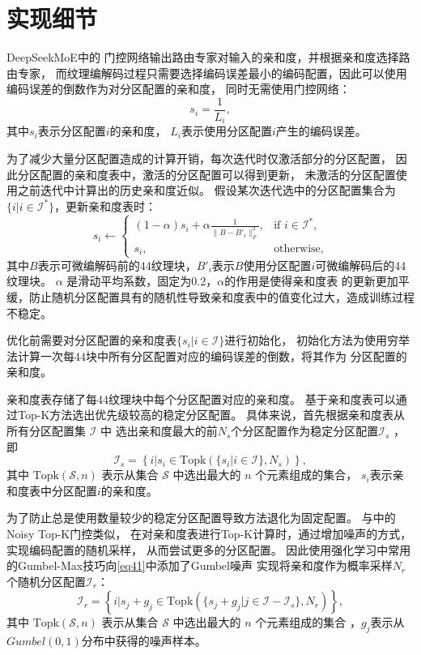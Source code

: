 \section{实现细节}

DeepSeekMoE\cite{dai2024deepseekmoe}中的
门控网络输出路由专家对输入的亲和度，并根据亲和度选择路由专家，
而纹理编解码过程只需要选择编码误差最小的编码配置，因此可以使用编码误差的倒数作为对分区配置的亲和度，
同时无需使用门控网络：
\begin{equation}
s_i=\frac{1}{L_i},
\end{equation}
其中$s_i$表示分区配置$i$的亲和度，
$L_i$表示使用分区配置$i$产生的编码误差。

为了减少大量分区配置造成的计算开销，每次迭代时仅激活部分的分区配置，
因此分区配置的亲和度表中，激活的分区配置可以得到更新，
未激活的分区配置使用之前迭代中计算出的历史亲和度近似。
假设某次迭代选中的分区配置集合为$\{i|i\in\mathcal{I}^*\}$，更新亲和度表时：
\begin{equation}
    s_i\leftarrow
    \begin{cases} 
        (1-\alpha)s_i+\alpha\frac{1}{\|B-B'_i\|_F^2}, & \text{if } i\in\mathcal{I}^*,\\
    s_i, & \text{otherwise},
    \end{cases}
\end{equation}
其中$B$表示可微编解码前的4\times4纹理块，$B'_i$表示$B$使用分区配置$i$可微编解码后的4\times4纹理块。
$\alpha$ 是滑动平均系数，固定为0.2，$\alpha$的作用是使得亲和度表
的更新更加平缓，防止随机分区配置具有的随机性导致亲和度表中的值变化过大，造成训练过程不稳定。

优化前需要对分区配置的亲和度表$\{s_i|i\in\mathcal{I}\}$进行初始化，
初始化方法为使用穷举法计算一次每4\times4块中所有分区配置对应的编码误差的倒数，将其作为
分区配置的亲和度。

亲和度表存储了每4\times4纹理块中每个分区配置对应的亲和度。
基于亲和度表可以通过Top-K方法选出优先级较高的稳定分区配置。
具体来说，首先根据亲和度表从所有分区配置集 $\mathcal{I}$ 中
选出亲和度最大的前$N_s$个分区配置作为稳定分区配置$\mathcal{I}_s$ ，即
\begin{equation}
\label{eq41}
\mathcal{I}_s=\left\{i|s_i\in\text{Topk}(\{s_i|i\in\mathcal{I}\},N_s)\right\},
\end{equation}
其中 $\text{Topk}(\mathcal{S},n)$ 表示从集合 $\mathcal{S}$ 中选出最大的 $n$ 个元素组成的集合，
$s_i$表示亲和度表中分区配置$i$的亲和度。

为了防止总是使用数量较少的稳定分区配置导致方法退化为固定配置。
与中的Noisy Top-K门控类似，
在对亲和度表进行Top-K计算时，通过增加噪声的方式，实现编码配置的随机采样，
从而尝试更多的分区配置。
因此使用强化学习中常用的Gumbel-Max技巧\cite{jang2016categorical}向\eqref{eq41}中添加了Gumbel噪声\cite{jang2016categorical}
实现将亲和度作为概率采样$N_r$个随机分区配置$\mathcal{I}_r$：
\begin{equation}
\mathcal{I}_r=\left\{i|s_j+g_j\in\text{Topk}(\{s_j+g_j|j\in\mathcal{I}-\mathcal{I}_s\},N_r)\right\},
\end{equation}
其中 $\text{Topk}(\mathcal{S},n)$ 表示从集合 $\mathcal{S}$ 中选出最大的 $n$ 个元素组成的集合
，$g_j$表示从$Gumbel(0,1)$分布中获得的噪声样本。

